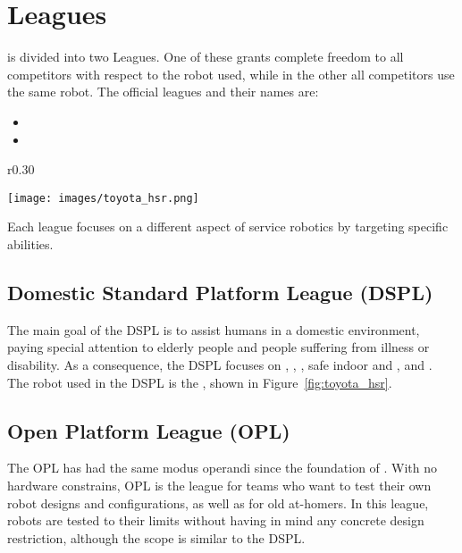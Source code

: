 \section{Leagues}
\label{sec:leagues}

\AtHome{} is divided into two Leagues. One of these grants complete freedom to all competitors with respect to the robot used, while in the other all competitors use the same robot. The official leagues and their names are:
\begin{itemize}
  \item \OPL
  \item \DSPL
\end{itemize}

\begin{wrapfigure}[21]{r}{0.30\textwidth}
	\vspace{-30pt}
	\begin{center}
		\texttt{[image: images/toyota\_hsr.png]}
		\vspace{-10pt}
		\caption{Toyota HSR}\label{fig:toyota_hsr}
	\end{center}
\end{wrapfigure}
Each league focuses on a different aspect of service robotics by targeting specific abilities.

\subsection{Domestic Standard Platform League (DSPL)}

The main goal of the DSPL is to assist humans in a domestic environment, paying special attention to elderly people and people suffering from illness or disability.
As a consequence, the DSPL focuses on \AmI, \CV, \OM, safe indoor \NAV{} and \MAP, and \TP.
The robot used in the DSPL is the \HSR, shown in Figure~\ref{fig:toyota_hsr}.

\subsection{Open Platform League (OPL)}

The OPL has had the same modus operandi since the foundation of \AtHome.
With no hardware constrains, OPL is the league for teams who want to test their own robot designs and configurations, as well as for old at-homers.
In this league, robots are tested to their limits without having in mind any concrete design restriction, although the scope is similar to the DSPL.
